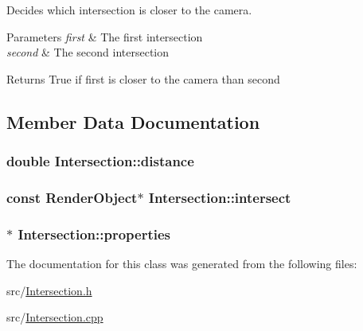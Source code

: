 Decides which intersection is closer to the camera. 


\begin{DoxyParams}{Parameters}
{\em first} & The first intersection \\
\hline
{\em second} & The second intersection \\
\hline
\end{DoxyParams}
\begin{DoxyReturn}{Returns}
True if first is closer to the camera than second 
\end{DoxyReturn}


\subsection{Member Data Documentation}
\subsubsection[{\texorpdfstring{distance}{distance}}]{\setlength{\rightskip}{0pt plus 5cm}double Intersection\+::distance\hspace{0.3cm}{\ttfamily [private]}}\hypertarget{classIntersection_a65da854f067b6f08175a97d262a17f1e}{}\label{classIntersection_a65da854f067b6f08175a97d262a17f1e}
\subsubsection[{\texorpdfstring{intersect}{intersect}}]{\setlength{\rightskip}{0pt plus 5cm}const {\bf Render\+Object}$\ast$ Intersection\+::intersect\hspace{0.3cm}{\ttfamily [private]}}\hypertarget{classIntersection_a8241676dd0f240769dc189132dc3c5bb}{}\label{classIntersection_a8241676dd0f240769dc189132dc3c5bb}
\subsubsection[{\texorpdfstring{properties}{properties}}]{$\ast$ Intersection\+::properties\hspace{0.3cm}{\ttfamily [private]}}\hypertarget{classIntersection_ad9d38892c2e47f51ae2497904050c00e}{}\label{classIntersection_ad9d38892c2e47f51ae2497904050c00e}


The documentation for this class was generated from the following files\+:\begin{DoxyCompactItemize}
\item 
src/\hyperlink{Intersection_8h}{Intersection.\+h}\item 
src/\hyperlink{Intersection_8cpp}{Intersection.\+cpp}\end{DoxyCompactItemize}

